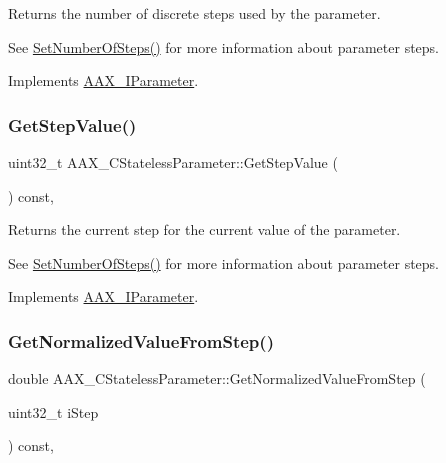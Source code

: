 Returns the number of discrete steps used by the parameter. 

See \mbox{\hyperlink{a01541_a5bf5527cf5ef918923dd21f4ebee6179}{Set\+Number\+Of\+Steps()}} for more information about parameter steps. 

Implements \mbox{\hyperlink{a01857_af2a4893e048666aca929846e7b5634cd}{A\+A\+X\+\_\+\+I\+Parameter}}.

\mbox{\label{a01541_a3b974a1d9aedf044339741b0035007e8}} 
\subsubsection{\texorpdfstring{GetStepValue()}{GetStepValue()}}
{\footnotesize\ttfamily uint32\+\_\+t A\+A\+X\+\_\+\+C\+Stateless\+Parameter\+::\+Get\+Step\+Value (\begin{DoxyParamCaption}{ }\end{DoxyParamCaption}) const\hspace{0.3cm}{\ttfamily [inline]}, {\ttfamily [virtual]}}



Returns the current step for the current value of the parameter. 

See \mbox{\hyperlink{a01541_a5bf5527cf5ef918923dd21f4ebee6179}{Set\+Number\+Of\+Steps()}} for more information about parameter steps. 

Implements \mbox{\hyperlink{a01857_ad4fc7431439f53cc0253d191b19db00b}{A\+A\+X\+\_\+\+I\+Parameter}}.

\mbox{\label{a01541_a26577262d2c31f5c62a3aa1f768199ce}} 
\subsubsection{\texorpdfstring{GetNormalizedValueFromStep()}{GetNormalizedValueFromStep()}}
{\footnotesize\ttfamily double A\+A\+X\+\_\+\+C\+Stateless\+Parameter\+::\+Get\+Normalized\+Value\+From\+Step (\begin{DoxyParamCaption}\item[{uint32\+\_\+t}]{i\+Step }\end{DoxyParamCaption}) const\hspace{0.3cm}{\ttfamily [inline]}, {\ttfamily [virtual]}}



